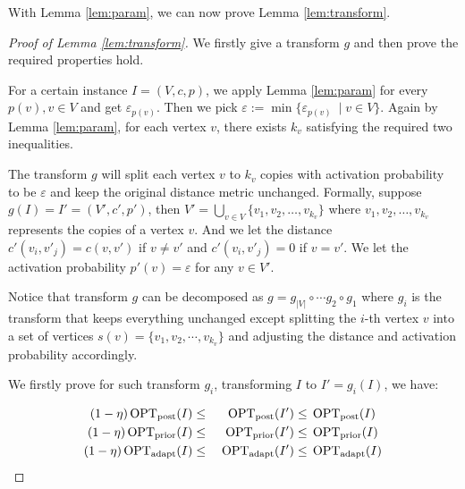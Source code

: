 \documentclass[12pt]{amsart}
\begin{document}
With Lemma \ref{lem:param}, we can now prove Lemma \ref{lem:transform}.

\begin{proof}[Proof of Lemma \ref{lem:transform}]
    We firstly give a transform $g$ and then prove the required properties hold.

    For a certain instance $I = (V, c, p)$, we apply Lemma \ref{lem:param} for every $p(v), v \in V$ and get $\varepsilon_{p(v)}$. Then we pick $\varepsilon := \min \{\varepsilon_{p(v)}\ \mid v \in V\}$. Again by Lemma \ref{lem:param}, for each vertex $v$, there exists $k_v$ satisfying the required two inequalities. 
    
    The transform $g$ will split each vertex $v$ to $k_v$ copies with activation probability to be $\varepsilon$ and keep the original distance metric unchanged. Formally, suppose $g(I) = I' = (V', c', p')$, then $V' = \bigcup_{v \in  V} \{v_1, v_2, \dots, v_{k_v}\}$ where $v_1, v_2, \dots, v_{k_v}$ represents the copies of a vertex $v$. And we let the distance $c'(v_i, v'_j) = c(v, v')$ if $v \neq v'$ and $c'(v_i, v'_j) = 0$ if $v = v'$. We let the activation probability $p'(v) = \varepsilon$ for any $v \in V'$.

    Notice that transform $g$ can be decomposed as $g = g_{|V|}  \circ \cdots g_2 \circ g_1$ where $g_i$ is the transform that keeps everything unchanged except splitting the $i$-th vertex $v$ into a set of vertices $s(v) = \{v_{1}, v_{2}, \cdots, v_{k_{v}}\}$ and adjusting the distance and activation probability accordingly. 

    We firstly prove for such transform $g_i$, transforming $I$ to $I' = g_i(I)$, we have:

    \begin{alignat*}{2}
        (1-\eta)\operatorname{OPT}_\mathrm{post}(I)  &\le{}& \operatorname{OPT}_\mathrm{post}(I')  &\le{} \operatorname{OPT}_\mathrm{post}(I) \\
        (1-\eta)\operatorname{OPT}_\mathrm{prior}(I) &\le{}& \operatorname{OPT}_\mathrm{prior}(I') &\le{} \operatorname{OPT}_\mathrm{prior}(I) \\
        (1-\eta)\operatorname{OPT}_\mathrm{adapt}(I) &\le{}& \operatorname{OPT}_\mathrm{adapt}(I') &\le{} \operatorname{OPT}_\mathrm{adapt}(I)
    \end{alignat*}


\end{proof}
\end{document}
